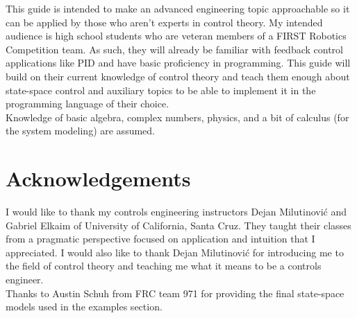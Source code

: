 This guide is intended to make an advanced engineering topic approachable so it
can be applied by those who aren't experts in control theory. My intended
audience is high school students who are veteran members of a FIRST Robotics
Competition team. As such, they will already be familiar with feedback control
applications like PID and have basic proficiency in programming. This guide will
build on their current knowledge of control theory and teach them enough about
state-space control and auxiliary topics to be able to implement it in the
programming language of their choice. \\

Knowledge of basic algebra, complex numbers, physics, and a bit of calculus (for
the system modeling) are assumed.

\vfill\eject

\section*{Acknowledgements}

I would like to thank my controls engineering instructors Dejan Milutinovi\'c
and Gabriel Elkaim of University of California, Santa Cruz. They taught their
classes from a pragmatic perspective focused on application and intuition that I
appreciated. I would also like to thank Dejan Milutinovi\'c for introducing me
to the field of control theory and teaching me what it means to be a controls
engineer. \\

Thanks to Austin Schuh from FRC team 971 for providing the final state-space
models used in the examples section.

\clearpage
\setcounter{secnumdepth}{3}
